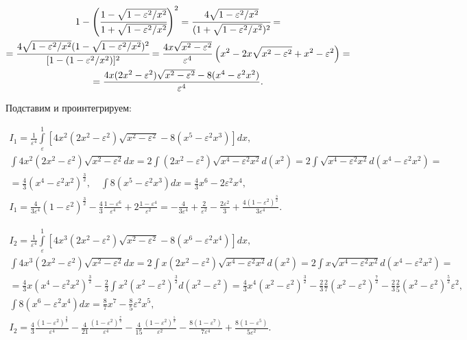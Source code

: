 \documentclass[a4paper,12pt]{article} %
\newcommand{\eps}{\varepsilon}
\begin{document}
\begin{equation}
\begin{gathered}
    1 - \Bigg(\cfrac{1 - \sqrt{1 - \eps^2/x^2}}{1 + \sqrt{1 - \eps^2 /
    x^2}}\Bigg)^2 =
    \cfrac{4\sqrt{1 - \eps^2 / x^2}}{(1 + \sqrt{1 - \eps^2 / x^2})^2}=\\
    =\cfrac{4\sqrt{1 - \eps^2 / x^2}(1 - \sqrt{1 - \eps^2 / x^2})^2}
    {[1 - (1 - \eps^2 / x^2)]^2}= \frac{4x\sqrt{x^2-\eps^2}}{\eps^4}
    \left(x^2 - 2x\sqrt{x^2-\eps^2} + x^2 - \eps^2\right)=\\
    =\frac{4x(2x^2-\eps^2)\sqrt{x^2-\eps^2}-8(x^4-\eps^2x^2)}{\eps^4}.
\end{gathered}
\end{equation}

Подставим и проинтегрируем:

\begin{equation}
\begin{gathered}
    I_1 = \frac{1}{\eps^4}\int\limits_\eps^1
    [4x^2(2x^2-\eps^2)\sqrt{x^2-\eps^2}-8(x^5-\eps^2x^3)]dx,\\
    \int 4x^2(2x^2-\eps^2)\sqrt{x^2-\eps^2} dx =
    2\int (2x^2-\eps^2)\sqrt{x^4-\eps^2x^2} d(x^2) =
    2\int \sqrt{x^4-\eps^2x^2} d(x^4-\eps^2x^2) =\\=
    \frac{4}{3}(x^4-\eps^2x^2)^\frac{3}{2},\quad
    \int 8(x^5-\eps^2x^3)dx = \frac{4}{3}x^6 - 2\eps^2x^4,\\
    I_1 = \frac{4}{3\eps^4}(1-\eps^2)^\frac{3}{2} -
    \frac{4}{3}\frac{1-\eps^6}{\eps^4} + 2\frac{1-\eps^4}{\eps^2}=
    -\frac{4}{3\eps^4}+\frac{2}{\eps^2}-\frac{2\eps^2}{3}+\frac{4(1-\eps^2)^\frac{3}{2}}{3\eps^4}.
\end{gathered}
\end{equation}

\begin{equation}
\begin{gathered}
    I_2 = \frac{1}{\eps^4}\int\limits_\eps^1
    [4x^3(2x^2-\eps^2)\sqrt{x^2-\eps^2}-8(x^6-\eps^2x^4)]dx,
    \\
    \int 4x^3(2x^2-\eps^2)\sqrt{x^2-\eps^2} dx =
    2\int x(2x^2-\eps^2)\sqrt{x^4-\eps^2x^2} d(x^2) =
    2\int x\sqrt{x^4-\eps^2x^2} d(x^4-\eps^2x^2) =\\=
    \frac{4}{3}x(x^4-\eps^2x^2)^\frac{3}{2}-\frac{2}{3}\int
    x^2(x^2-\eps^2)^\frac{3}{2} d(x^2-\eps^2)=
    \frac{4}{3}x^4(x^2-\eps^2)^\frac{3}{2}-
    \frac{2}{3}\frac{2}{7}(x^2-\eps^2)^\frac{7}{2} -
    \frac{2}{3}\frac{2}{5}(x^2-\eps^2)^\frac{5}{2}\eps^2,
    \\
    \int 8(x^6-\eps^2x^4)dx = \frac{8}{7}x^7 - \frac{8}{5}\eps^2x^5,
    \\
    I_2 = \frac{4}{3}\frac{(1-\eps^2)^\frac{3}{2}}{\eps^4}-
    \frac{4}{21}\frac{(1-\eps^2)^\frac{7}{2}}{\eps^4} -
    \frac{4}{15}\frac{(1-\eps^2)^\frac{5}{2}}{\eps^2} -
    \frac{8(1-\eps^7)}{7\eps^4} +
    \frac{8(1-\eps^5)}{5\eps^2}.
\end{gathered}
\end{equation}
\end{document}
